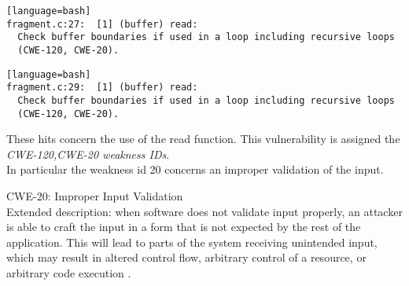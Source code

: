 \documentclass[a4paper,12pt]{article}
\newenvironment{SpecialPar}
  {\begin{shaded}}
  {\end{shaded}}
\begin{document}
\begin{lstlisting}[style=DOS][language=bash]
fragment.c:27:  [1] (buffer) read:
  Check buffer boundaries if used in a loop including recursive loops
  (CWE-120, CWE-20).
\end{lstlisting}

\begin{lstlisting}[style=DOS][language=bash]
fragment.c:29:  [1] (buffer) read:
  Check buffer boundaries if used in a loop including recursive loops
  (CWE-120, CWE-20).

\end{lstlisting}
These hits concern the use of the read function.
This vulnerability is assigned the \textit{CWE-120,CWE-20 weakness IDs}.\\
In particular the weakness id 20 concerns an improper validation of the input.\cite{CWE}

\begin{SpecialPar}
\noindent
CWE-20: Improper Input Validation\\
Extended description: when software does not validate input properly, an attacker is able to craft the input in a form that is not expected by the rest of the application. This will lead to parts of the system receiving unintended input, which may result in altered control flow, arbitrary control of a resource, or arbitrary code execution \cite{CWE20}.
\end{SpecialPar}
\end{document}

